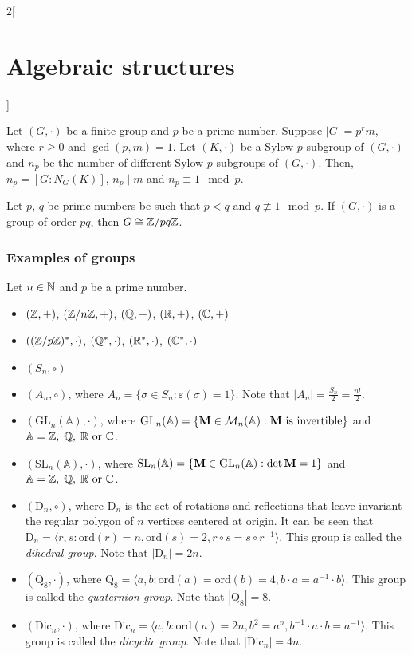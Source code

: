 \documentclass[../../../main.tex]{subfiles}
\begin{document}
\begin{multicols}{2}[\section{Algebraic structures}]
\begin{theorem}
    \end{theorem}
    \begin{theorem}
        Let $(G,\cdot)$ be a finite group and $p$ be a prime number. Suppose $|G|=p^r m$, where $r\geq 0$ and $\gcd(p,m)=1$. Let $(K,\cdot)$ be a Sylow $p$-subgroup of $(G,\cdot)$ and $n_p$ be the number of different Sylow $p$-subgroups of $(G,\cdot)$. Then, $n_p=[G:N_G(K)]$, $n_p\mid m$ and $n_p\equiv1\mod p$.
    \end{theorem}
    \begin{corollary}
        Let $p$, $q$ be prime numbers be such that $p<q$ and $q\not\equiv 1\mod p$. If $(G,\cdot)$ is a group of order $pq$, then $G\cong\quot{\ZZ}{pq\ZZ}$.
    \end{corollary}
    \subsubsection{Examples of groups}\label{AS_examples}
    Let $n\in\mathbb{N}$ and $p$ be a prime number.
    \begin{itemize}
        \item $(\mathbb{Z},+)$, $(\mathbb{Z}/n\mathbb{Z},+)$, $(\mathbb{Q},+)$, $(\mathbb{R},+)$, $(\mathbb{C},+)$
        \item $((\mathbb{Z}/p\mathbb{Z})^*,\cdot)$, $(\mathbb{Q}^*,\cdot)$, $(\mathbb{R}^*,\cdot)$, $(\mathbb{C}^*,\cdot)$
        \item $(S_n,\circ)$
        \item $(A_n,\circ)$, where $A_n=\{\sigma\in S_n:\varepsilon(\sigma)=1\}$. Note that $|A_n|=\frac{S_n}{2}=\frac{n!}{2}$.
        \item $(\text{GL}_n(\mathbb{A}),\cdot)$, where $\text{GL}_n(\mathbb{A})=\{\boldsymbol{\mathrm{M}}\in\mathcal{M}_n(\mathbb{A}):\boldsymbol{\mathrm{M}}\text{ is invertible}\}$ and $\mathbb{A}=\mathbb{Z},\;\mathbb{Q},\;\mathbb{R}\text{ or }\mathbb{C}$.
        \item $(\text{SL}_n(\mathbb{A}),\cdot)$, where $\text{SL}_n(\mathbb{A})=\{\boldsymbol{\mathrm{M}}\in\text{GL}_n(\mathbb{A}):\det\boldsymbol{\mathrm{M}}=1\}$ and $\mathbb{A}=\mathbb{Z},\;\mathbb{Q},\;\mathbb{R}\text{ or }\mathbb{C}$.
        \item $(\text{D}_n,\circ)$, where $\text{D}_n$ is the set of rotations and reflections that leave invariant the regular polygon of $n$ vertices centered at origin. It can be seen that $\text{D}_n=\langle r,s:\text{ord}(r)=n,\text{ord}(s)=2,r\circ s=s\circ r^{-1}\rangle$. This group is called the \textit{dihedral group}. Note that $|\text{D}_n|=2n$.
        \item $(\text{Q}_8,\cdot)$, where $\text{Q}_8=\langle a,b:\text{ord}(a)=\text{ord}(b)=4,b\cdot a=a^{-1}\cdot b\rangle$. This group is called the \textit{quaternion group}. Note that $|\text{Q}_8|=8$.
        \item $(\text{Dic}_n,\cdot)$, where $\text{Dic}_n=\langle a,b:\text{ord}(a)=2n,b^2=a^n,b^{-1}\cdot a\cdot b=a^{-1}\rangle$. This group is called the \textit{dicyclic group}. Note that $|\text{Dic}_n|=4n$.
    \end{itemize}

\end{multicols}
\end{document}
